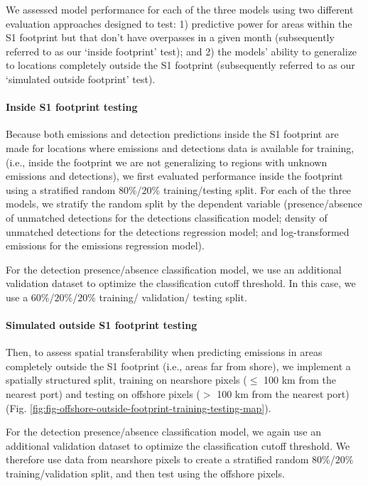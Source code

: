 \documentclass[lineno,pdflatex,sn-nature]{sn-jnl}
\begin{document}
We assessed model performance for each of the three models using two different evaluation approaches designed to test: 1) predictive power for areas within the S1 footprint but that don't have overpasses in a given month (subsequently referred to as our `inside footprint' test); and 2) the models' ability to generalize to locations completely outside the S1 footprint (subsequently referred to as our `simulated outside footprint' test).

\paragraph{Inside S1 footprint testing}

Because both emissions and detection predictions inside the S1 footprint are made for locations where emissions and detections data is available for training, (i.e., inside the footprint we are not generalizing to regions with unknown emissions and detections), we first evaluated performance inside the footprint using a stratified random $80\%$/$20\%$ training/testing split. For each of the three models, we stratify the random split by the dependent variable (presence/absence of unmatched detections for the detections classification model; density of unmatched detections for the detections regression model; and log-transformed emissions for the emissions regression model). 

For the detection presence/absence classification model, we use an additional validation dataset to optimize the classification cutoff threshold. In this case, we use a $60\%$/$20\%$/$20\%$ training/ validation/ testing split.

\paragraph{Simulated outside S1 footprint testing}

Then, to assess spatial transferability when predicting emissions in areas completely outside the S1 footprint (i.e., areas far from shore), we implement a spatially structured split, training on nearshore pixels ($\le$ 100 km from the nearest port) and testing on offshore pixels ($>$ 100 km from the nearest port) (Fig. \ref{fig:fig-offshore-outside-footprint-training-testing-map}). 

For the detection presence/absence classification model, we again use an additional validation dataset to optimize the classification cutoff threshold. We therefore use data from nearshore pixels to create a stratified random $80\%$/$20\%$ training/validation split, and then test using the offshore pixels.
\end{document}
